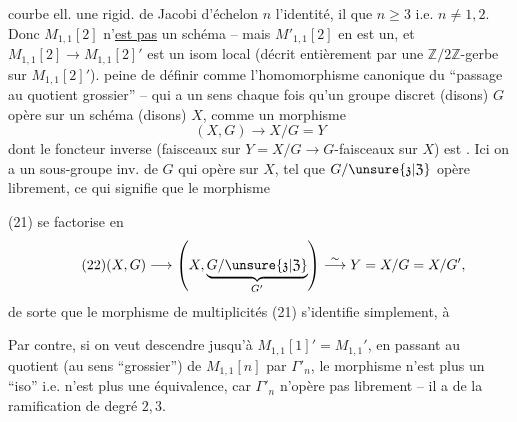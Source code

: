 courbe ell.  une rigid. de Jacobi d'échelon $n$  l'identité, il  que $n\geq 3$ i.e. $n\neq 1,2$. Donc $M_{1,1}[2]$ n'\uline{est pas} un schéma -- mais $M'_{1,1}[2]$ en est un, et $M_{1,1}[2]\to M_{1,1}[2]'$ est un  isom local (décrit entièrement par une $\mathbb Z/2\mathbb Z$-gerbe sur $M_{1,1}[2]'$).   peine de définir
comme l'homomorphisme canonique du ``passage au quotient grossier'' -- qui a un sens chaque fois qu'un groupe discret (disons)\unsure{\S} $G$ opère sur un schéma (disons) $X$, comme un morphisme
\[
\tag{21}
(X,G)\longrightarrow X/G=Y
\]
dont le foncteur  inverse (faisceaux sur $Y=X/G\longrightarrow G$-faisceaux sur $X$) est . Ici on a un sous-groupe inv.  de $G$ qui opère  sur $X$, tel que $G/\unsure{\mathfrak z|\mathfrak Z}$ opère librement, ce qui signifie que le morphisme


(21) se factorise en
\[
\tag{22}
(X,G)\longrightarrow
\left(X,\underbrace{G/\unsure{\mathfrak z|\mathfrak Z}}_{G'}\right)
\overset{\sim}{\longrightarrow}Y=X/G=X/G',
\]
de sorte que le morphisme de multiplicités (21) s'identifie  simplement, à

Par contre, si on veut descendre jusqu'à $M_{1,1}[1]'=M_{1,1}'$, en passant au quotient (au sens ``grossier'') de $M_{1,1}[n]$ par $\Gamma'_n$, le morphisme
n'est plus un ``iso'' i.e. n'est plus une équivalence, car $\Gamma'_n$ n'opère pas librement -- il a  de la ramification de degré $2,3$.

